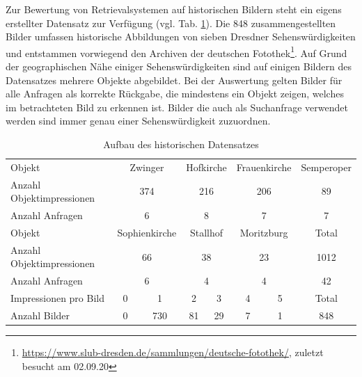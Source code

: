 Zur Bewertung von Retrievalsystemen auf historischen Bildern steht ein eigens erstellter Datensatz zur Verfügung (vgl. Tab. \ref{hist4d_data}). Die 848 zusammengestellten Bilder umfassen historische Abbildungen von sieben Dresdner Sehenswürdigkeiten und entstammen vorwiegend den Archiven der deutschen Fotothek\footnote{\url{https://www.slub-dresden.de/sammlungen/deutsche-fotothek/}, zuletzt besucht am 02.09.20}. Auf Grund der geographischen Nähe einiger Sehenswürdigkeiten sind auf einigen Bildern des Datensatzes mehrere Objekte abgebildet. Bei der Auswertung gelten Bilder für alle Anfragen als korrekte Rückgabe, die mindestens ein Objekt zeigen, welches im betrachteten Bild zu erkennen ist. Bilder die auch als Suchanfrage verwendet werden sind immer genau einer Sehenswürdigkeit zuzuordnen.\\
\begin{table}[h]
\centering

\begin{tabular}{l|c|c|c|c|c|c|c}
\rowcolor[HTML]{C0C0C0} 
Objekt &
  \multicolumn{2}{c|}{\cellcolor[HTML]{C0C0C0}Zwinger} &
  \multicolumn{2}{c|}{\cellcolor[HTML]{C0C0C0}Hofkirche} &
  \multicolumn{2}{c|}{\cellcolor[HTML]{C0C0C0}Frauenkirche} &
  Semperoper \\
Anzahl Objektimpressionen & \multicolumn{2}{c|}{374} & \multicolumn{2}{c|}{216} & \multicolumn{2}{c|}{206} & 89    \\
Anzahl Anfragen           & \multicolumn{2}{c|}{6}   & \multicolumn{2}{c|}{8}   & \multicolumn{2}{c|}{7}   & 7     \\ \hline
\rowcolor[HTML]{C0C0C0} 
Objekt &
  \multicolumn{2}{c|}{\cellcolor[HTML]{C0C0C0}Sophienkirche} &
  \multicolumn{2}{c|}{\cellcolor[HTML]{C0C0C0}Stallhof} &
  \multicolumn{2}{c|}{\cellcolor[HTML]{C0C0C0}Moritzburg} &
  Total \\
Anzahl Objektimpressionen & \multicolumn{2}{c|}{66}  & \multicolumn{2}{c|}{38}  & \multicolumn{2}{c|}{23}  & 1012  \\
Anzahl Anfragen           & \multicolumn{2}{c|}{6}   & \multicolumn{2}{c|}{4}   & \multicolumn{2}{c|}{4}   & 42    \\ \hline
\rowcolor[HTML]{C0C0C0} 
Impressionen pro Bild     & \hspace{2.5mm} 0 \hspace{2.5mm}         & 1           & \hspace{1.1mm} 2 \hspace{1.1mm}           & 3          & \hspace{2mm} 4 \hspace{2mm}           & 5          & Total \\
Anzahl Bilder             & 0          & 730         & 81          & 29         & 7           & 1          & 848  
\end{tabular}%

\caption{Aufbau des historischen Datensatzes}
\label{hist4d_data}
\end{table}
